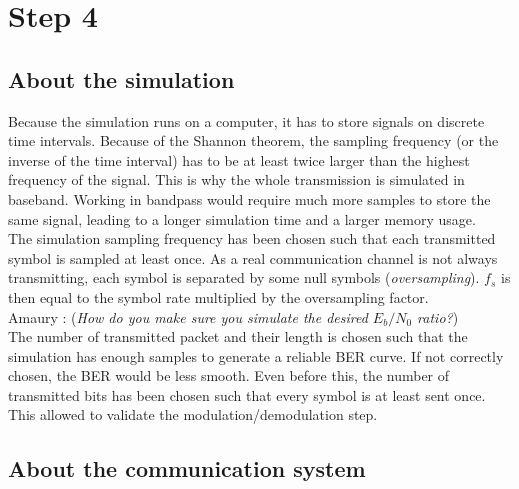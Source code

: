 \setcounter{secnumdepth}{-1}

\chapter{Step 4}

\section{About the simulation}

Because the simulation runs on a computer, it has to store signals on discrete time intervals. Because of the Shannon theorem, the sampling frequency (or the inverse of the time interval) has to be at least twice larger than the highest frequency of the signal. This is why the whole transmission is simulated in baseband. Working in bandpass would require much more samples to store the same signal, leading to a longer simulation time and a larger memory usage. \\

The simulation sampling frequency has been chosen such that each transmitted symbol is sampled at least once. As a real communication channel is not always transmitting, each symbol is separated by some null symbols (\textit{oversampling}). $f_s$ is then equal to the symbol rate multiplied by the oversampling factor. \\

{\Large Amaury : (\textit{How do you make sure you simulate the desired $E_b/N_0$ ratio?})} \\

The number of transmitted packet and their length is chosen such that the simulation has enough samples to generate a reliable BER curve. If not correctly chosen, the BER would be less smooth. Even before this, the number of transmitted bits has been chosen such that every symbol is at least sent once. This allowed to validate the modulation/demodulation step. \\

\section{About the communication system}

